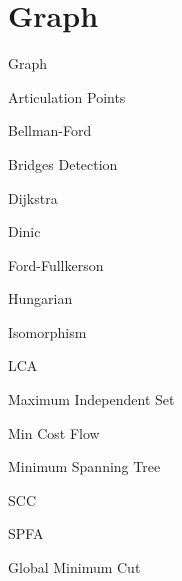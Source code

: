 \section{Graph}

Graph


Articulation Points


Bellman-Ford


Bridges Detection


Dijkstra


Dinic


Ford-Fullkerson


Hungarian


Isomorphism


LCA


Maximum Independent Set


Min Cost Flow


Minimum Spanning Tree


SCC


SPFA


Global Minimum Cut

